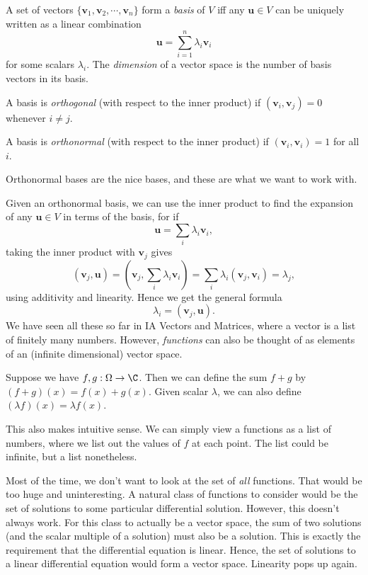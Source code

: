 \documentclass[a4paper]{article}
\begin{document}
\begin{defi}[Basis]
  A set of vectors $\{\mathbf{v}_1, \mathbf{v}_2, \cdots, \mathbf{v}_n\}$ form a \emph{basis} of $V$ iff any $\mathbf{u}\in V$ can be uniquely written as a linear combination
  \[
    \mathbf{u} = \sum_{i = 1}^n \lambda_i \mathbf{v}_i
  \]
  for some scalars $\lambda_i$. The \emph{dimension} of a vector space is the number of basis vectors in its basis.

  A basis is \emph{orthogonal} (with respect to the inner product) if $(\mathbf{v}_i, \mathbf{v}_j) = 0$ whenever $i\not = j$.

  A basis is \emph{orthonormal} (with respect to the inner product) if $(\mathbf{v}_i, \mathbf{v}_i) = 1$ for all $i$.
\end{defi}
Orthonormal bases are the nice bases, and these are what we want to work with.

Given an orthonormal basis, we can use the inner product to find the expansion of any $\mathbf{u}\in V$ in terms of the basis, for if
\[
  \mathbf{u} = \sum_i \lambda_i \mathbf{v}_i,
\]
taking the inner product with $\mathbf{v}_j$ gives
\[
  (\mathbf{v}_j, \mathbf{u}) = \left(\mathbf{v}_j, \sum_i \lambda_i \mathbf{v}_i\right) = \sum_i \lambda_i (\mathbf{v}_j, \mathbf{v}_i) = \lambda_j,
\]
using additivity and linearity. Hence we get the general formula
\[
  \lambda_i = (\mathbf{v}_j, \mathbf{u}).
\]
We have seen all these so far in IA Vectors and Matrices, where a vector is a list of finitely many numbers. However, \emph{functions} can also be thought of as elements of an (infinite dimensional) vector space.

Suppose we have $f, g: \Omega \to \C$. Then we can define the sum $f + g$ by $(f + g)(x) = f(x) + g(x)$. Given scalar $\lambda$, we can also define $(\lambda f)(x) = \lambda f(x)$.

This also makes intuitive sense. We can simply view a functions as a list of numbers, where we list out the values of $f$ at each point. The list could be infinite, but a list nonetheless.

Most of the time, we don't want to look at the set of \emph{all} functions. That would be too huge and uninteresting. A natural class of functions to consider would be the set of solutions to some particular differential solution. However, this doesn't always work. For this class to actually be a vector space, the sum of two solutions (and the scalar multiple of a solution) must also be a solution. This is exactly the requirement that the differential equation is linear. Hence, the set of solutions to a linear differential equation would form a vector space. Linearity pops up again.
\end{document}
